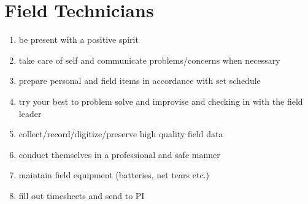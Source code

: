 \documentclass[12pt]{article}
\begin{document}
\section{Field Technicians}
\begin{enumerate}
\item be present with a positive spirit
\item take care of self and communicate problems/concerns when
  necessary
\item prepare personal and field items in accordance with set schedule
\item try your best to problem solve and improvise and checking in
  with the field leader
\item collect/record/digitize/preserve high quality field data
\item conduct themselves in a professional and safe manner
\item maintain field equipment (batteries, net tears etc.)
\item fill out timesheets and send to PI
\end{enumerate}
\end{document}

